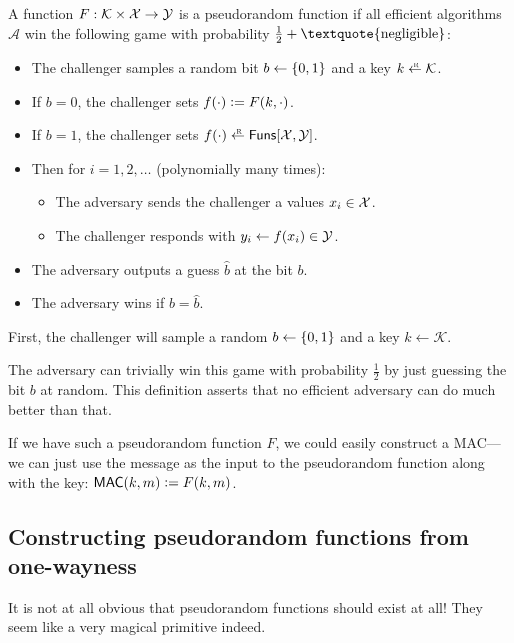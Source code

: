 \begin{definition}\label{defn:prf}
A function $F: \mathcal{K} \times \mathcal{X} \rightarrow \mathcal{Y}$ is a pseudorandom
function if all efficient algorithms $\mathcal{A}$ win
the following game with probability $\tfrac{1}{2} + \text{\textquote{negligible}}$: 

  \begin{itemize}[noitemsep]
    \item The challenger samples a random bit $b \gets \{0,1\}$ and a key $k \getsr \calK$.
    \item If $b = 0$, the challenger sets $f(\cdot) \mathrel{\mathop:}= F(k, \cdot)$.
    \item If $b = 1$, the challenger sets $f(\cdot) \getsr \Funs[\calX, \calY]$.
    \item Then for $i = 1, 2, \dots$ (polynomially many times):
      \begin{itemize}
        \item The adversary sends the challenger a values $x_i \in \mathcal{X}$.
        \item The challenger responds with $y_i \gets f(x_i) \in \mathcal{Y}$.
      \end{itemize}
    \item The adversary outputs a guess $\hat{b}$ at the bit $b$.
    \item The adversary wins if $b = \hat{b}$.
  \end{itemize}
First, the challenger will sample a random $b \leftarrow \{0,1\}$ and a key $k \leftarrow \mathcal{K}$. 
\end{definition}

The adversary can trivially win this game with
probability $\tfrac{1}{2}$ by just guessing the
bit $b$ at random.
This definition asserts that
no efficient adversary can do much better than that.

If we have such a pseudorandom function $F$, we
could easily construct a MAC---we can just use the
message as the input to the pseudorandom function
along with the key: $\mathsf{MAC}(k, m) \mathrel{\mathop:}= F(k, m)$.


\subsection{Constructing pseudorandom functions from one-wayness}

It is not at all obvious that pseudorandom functions should exist
at all! They seem like a very magical primitive indeed.

